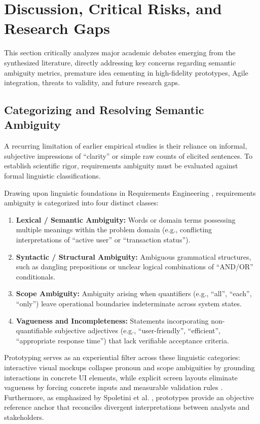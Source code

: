\section{Discussion, Critical Risks, and Research Gaps}
\label{sec:discussion}

This section critically analyzes major academic debates emerging from the synthesized literature, directly addressing key concerns regarding semantic ambiguity metrics, premature idea cementing in high-fidelity prototypes, Agile integration, threats to validity, and future research gaps.

\subsection{Categorizing and Resolving Semantic Ambiguity}
A recurring limitation of earlier empirical studies is their reliance on informal, subjective impressions of ``clarity'' or simple raw counts of elicited sentences. To establish scientific rigor, requirements ambiguity must be evaluated against formal linguistic classifications.

Drawing upon linguistic foundations in Requirements Engineering \cite{berry2003from, cascon2025ambiguity}, requirements ambiguity is categorized into four distinct classes:
\begin{enumerate}
    \item \textbf{Lexical / Semantic Ambiguity:} Words or domain terms possessing multiple meanings within the problem domain (e.g., conflicting interpretations of ``active user'' or ``transaction status'').
    \item \textbf{Syntactic / Structural Ambiguity:} Ambiguous grammatical structures, such as dangling prepositions or unclear logical combinations of ``AND/OR'' conditionals.
    \item \textbf{Scope Ambiguity:} Ambiguity arising when quantifiers (e.g., ``all'', ``each'', ``only'') leave operational boundaries indeterminate across system states.
    \item \textbf{Vagueness and Incompleteness:} Statements incorporating non-quantifiable subjective adjectives (e.g., ``user-friendly'', ``efficient'', ``appropriate response time'') that lack verifiable acceptance criteria.
\end{enumerate}

Prototyping serves as an experiential filter across these linguistic categories: interactive visual mockups collapse pronoun and scope ambiguities by grounding interactions in concrete UI elements, while explicit screen layouts eliminate vagueness by forcing concrete inputs and measurable validation rules \cite{ferrari2016ambiguity, cascon2025ambiguity}. Furthermore, as emphasized by Spoletini et al. \cite{spoletini2018interview}, prototypes provide an objective reference anchor that reconciles divergent interpretations between analysts and stakeholders.

